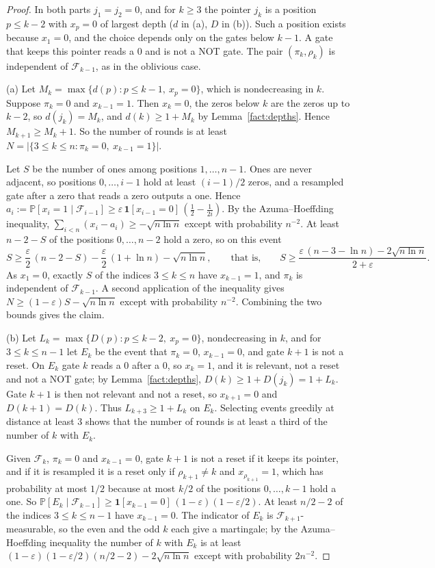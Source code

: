 \documentclass[11pt]{amsart}
\theoremstyle{definition}
\theoremstyle{remark}
\newcommand{\eps}{\varepsilon}
\newcommand{\PP}{\mathbb{P}}
\newcommand{\cF}{\mathcal{F}}
\begin{document}
\begin{proof}
In both parts $j_1=j_2=0$, and for $k\ge3$ the pointer $j_k$ is a position $p\le k-2$ with
$x_p=0$ of largest depth ($d$ in (a), $D$ in (b)). Such a position exists because $x_1=0$, and
the choice depends only on the gates below $k-1$. A gate that keeps this pointer reads a $0$ and
is not a NOT gate. The pair $(\pi_k,\rho_k)$ is independent of $\cF_{k-1}$, as in the oblivious
case.

(a) Let $M_k=\max\{d(p):p\le k-1,\ x_p=0\}$, which is nondecreasing in $k$. Suppose $\pi_k=0$ and
$x_{k-1}=1$. Then $x_k=0$, the zeros below $k$ are the zeros up to $k-2$, so $d(j_k)=M_k$, and
$d(k)\ge1+M_k$ by Lemma~\ref{fact:depths}. Hence $M_{k+1}\ge M_k+1$. So the number of rounds is at
least $N=|\{3\le k\le n:\pi_k=0,\ x_{k-1}=1\}|$.

Let $S$ be the number of ones among positions $1,\dots,n-1$. Ones are never adjacent, so
positions $0,\dots,i-1$ hold at least $(i-1)/2$ zeros, and a resampled gate after a zero that
reads a zero outputs a one. Hence
$a_i:=\PP[x_i=1\mid\cF_{i-1}]\ge\eps\,\mathbf 1[x_{i-1}=0]\,(\tfrac12-\tfrac1{2i})$. By the
Azuma--Hoeffding inequality, $\sum_{i<n}(x_i-a_i)\ge-\sqrt{n\ln n}$ except with probability
$n^{-2}$. At least $n-2-S$ of the positions $0,\dots,n-2$ hold a zero, so on this event
\[
S\ge\frac\eps2\,(n-2-S)-\frac\eps2\,(1+\ln n)-\sqrt{n\ln n},\qquad\text{that is,}\qquad
S\ge\frac{\eps\,(n-3-\ln n)-2\sqrt{n\ln n}}{2+\eps}.
\]
As $x_1=0$, exactly $S$ of the indices $3\le k\le n$ have $x_{k-1}=1$, and $\pi_k$ is independent
of $\cF_{k-1}$. A second application of the inequality gives $N\ge(1-\eps)S-\sqrt{n\ln n}$ except
with probability $n^{-2}$. Combining the two bounds gives the claim.

(b) Let $L_k=\max\{D(p):p\le k-2,\ x_p=0\}$, nondecreasing in $k$, and for $3\le k\le n-1$ let
$E_k$ be the event that $\pi_k=0$, $x_{k-1}=0$, and gate $k+1$ is not a reset. On $E_k$ gate $k$
reads a $0$ after a $0$, so $x_k=1$, and it is relevant, not a reset and not a NOT gate; by
Lemma~\ref{fact:depths}, $D(k)\ge1+D(j_k)=1+L_k$. Gate $k+1$ is then not relevant and not a reset, so
$x_{k+1}=0$ and $D(k+1)=D(k)$. Thus $L_{k+3}\ge1+L_k$ on $E_k$. Selecting events greedily at
distance at least $3$ shows that the number of rounds is at least a third of the number of $k$
with $E_k$.

Given $\cF_k$, $\pi_k=0$ and $x_{k-1}=0$, gate $k+1$ is not a reset if it keeps its pointer, and
if it is resampled it is a reset only if $\rho_{k+1}\ne k$ and $x_{\rho_{k+1}}=1$, which has
probability at most $1/2$ because at most $k/2$ of the positions $0,\dots,k-1$ hold a one. So
$\PP[E_k\mid\cF_{k-1}]\ge\mathbf 1[x_{k-1}=0]\,(1-\eps)(1-\eps/2)$. At least $n/2-2$ of the indices
$3\le k\le n-1$ have $x_{k-1}=0$. The indicator of $E_k$ is $\cF_{k+1}$-measurable, so the even and
the odd $k$ each give a martingale; by the Azuma--Hoeffding inequality the number of $k$ with $E_k$
is at least $(1-\eps)(1-\eps/2)(n/2-2)-2\sqrt{n\ln n}$ except with probability $2n^{-2}$.
\end{proof}
\end{document}
